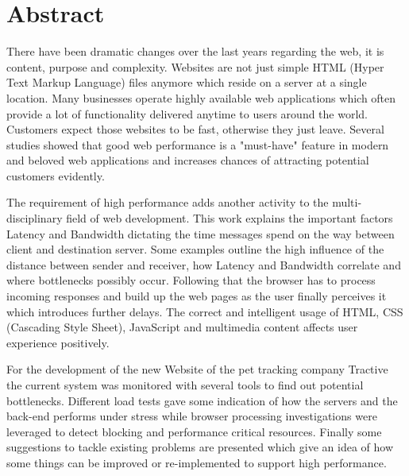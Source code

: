 \chapter*{Abstract}

There have been dramatic changes over the last years regarding the web, it is content, purpose and complexity. Websites are not just simple HTML (Hyper Text Markup Language) files anymore which reside on a server at a single location. Many businesses operate highly available web applications which often provide a lot of functionality delivered anytime to users around the world. Customers expect those websites to be fast, otherwise they just leave. Several studies showed that good web performance is a "must-have" feature in modern and beloved web applications and increases chances of attracting potential customers evidently. 

The requirement of high performance adds another activity to the multi-disciplinary field of web development. This work explains the important factors Latency and Bandwidth dictating the time messages spend on the way between client and destination server. Some examples outline the high influence of the distance between sender and receiver, how Latency and Bandwidth correlate and where bottlenecks possibly occur. Following that the browser has to process incoming responses and build up the web pages as the user finally perceives it which introduces further delays. The correct and intelligent usage of HTML, CSS (Cascading Style Sheet), JavaScript and multimedia content affects user experience positively. 

For the development of the new Website of the pet tracking company Tractive the current system was monitored with several tools to find out potential bottlenecks. Different load tests gave some indication of how the servers and the back-end performs under stress while browser processing investigations were leveraged to detect blocking and performance critical resources. Finally some suggestions to tackle existing problems are presented which give an idea of how some things can be improved or re-implemented to support high performance.